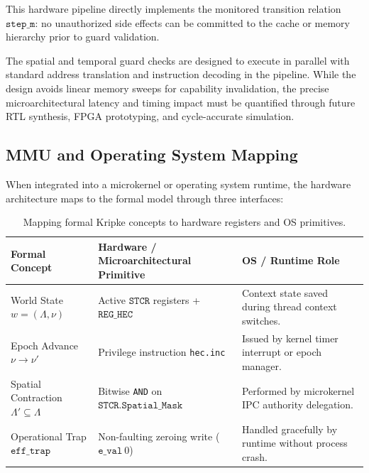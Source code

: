 This hardware pipeline directly implements the monitored transition relation $\mathtt{step\_m}$: no unauthorized side effects can be committed to the cache or memory hierarchy prior to guard validation.

The spatial and temporal guard checks are designed to execute in parallel with standard address translation and instruction decoding in the pipeline. While the design avoids linear memory sweeps for capability invalidation, the precise microarchitectural latency and timing impact must be quantified through future RTL synthesis, FPGA prototyping, and cycle-accurate simulation.

\subsection{MMU and Operating System Mapping}

When integrated into a microkernel or operating system runtime, the hardware architecture maps to the formal model through three interfaces:

\begin{table}[h]
\centering
\small
\begin{tabularx}{\textwidth}{l X X}
\hline
\textbf{Formal Concept} & \textbf{Hardware / Microarchitectural Primitive} & \textbf{OS / Runtime Role} \\
\hline
World State $w = (\Lambda, \nu)$ & Active $\mathtt{STCR}$ registers + $\mathtt{REG\_HEC}$ & Context state saved during thread context switches. \\
Epoch Advance $\nu \to \nu'$ & Privilege instruction \texttt{hec.inc} & Issued by kernel timer interrupt or epoch manager. \\
Spatial Contraction $\Lambda' \subseteq \Lambda$ & Bitwise \texttt{AND} on $\mathtt{STCR.Spatial\_Mask}$ & Performed by microkernel IPC authority delegation. \\
Operational Trap $\mathtt{eff\_trap}$ & Non-faulting zeroing write ($\mathtt{e\_val}~0$) & Handled gracefully by runtime without process crash. \\
\hline
\end{tabularx}
\caption{Mapping formal Kripke concepts to hardware registers and OS primitives.}
\label{tab:hardware_mapping}
\end{table}

